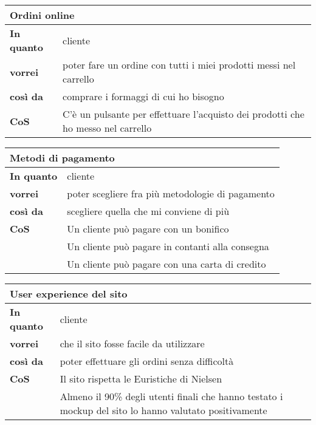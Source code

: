 \begin{tabularx}{\textwidth}{lX}
  \toprule
  \multicolumn{2}{l}{\textbf{Ordini online}} \\
  \midrule
  \textbf{In quanto} & cliente \\
  \textbf{vorrei} & poter fare un ordine con tutti i miei prodotti messi nel carrello \\
  \textbf{così da} & comprare i formaggi di cui ho bisogno \\
  \midrule
  \textbf{CoS} & C'è un pulsante per effettuare l'acquisto dei prodotti che ho messo nel carrello \\
  \bottomrule
\end{tabularx}

\begin{tabularx}{\textwidth}{lX}
  \toprule
  \multicolumn{2}{l}{\textbf{Metodi di pagamento}} \\
  \midrule
  \textbf{In quanto} & cliente \\
  \textbf{vorrei} & poter scegliere fra più metodologie di pagamento \\
  \textbf{così da} & scegliere quella che mi conviene di più \\
  \midrule
  \textbf{CoS} & Un cliente può pagare con un bonifico \\
  & Un cliente può pagare in contanti alla consegna \\
  & Un cliente può pagare con una carta di credito \\
  \bottomrule
\end{tabularx}

\begin{tabularx}{\textwidth}{lX}
  \toprule
  \multicolumn{2}{l}{\textbf{User experience del sito}} \\
  \midrule
  \textbf{In quanto} & cliente \\
  \textbf{vorrei} & che il sito fosse facile da utilizzare \\
  \textbf{così da} & poter effettuare gli ordini senza difficoltà \\
  \midrule
  \textbf{CoS} & Il sito rispetta le Euristiche di Nielsen \\
  & Almeno il 90\% degli utenti finali che hanno testato i mockup del sito lo hanno valutato positivamente \\
  \bottomrule
\end{tabularx}

